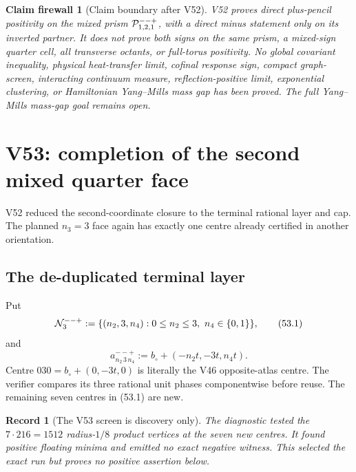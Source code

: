 \documentclass[11pt,oneside]{article}
\newtheorem{firewall}[theorem]{Claim firewall}
\newtheorem{record}[theorem]{Record}
\theoremstyle{definition}
\theoremstyle{remark}
\begin{document}
\begin{firewall}[Claim boundary after V52]
\label{fire:newv52-final}
V52 proves direct plus-pencil positivity on the mixed prism
\({\cal P}_{1,2,1}^{--+}\), with a direct minus statement only on
its inverted partner.  It does not prove both signs on the same
prism, a mixed-sign quarter cell, all transverse octants, or
full-torus positivity.  No global covariant inequality, physical
heat-transfer limit, cofinal response sign, compact graph-screen,
interacting continuum measure, reflection-positive limit,
exponential clustering, or Hamiltonian Yang--Mills mass gap has
been proved.  The full Yang--Mills mass-gap goal remains open.
\end{firewall}

\section{V53: completion of the second mixed quarter face}
\label{sec:newv53-mixed-second-quarter-face}

V52 reduced the second-coordinate closure to the terminal rational
layer and cap.  The planned \(n_3=3\) face again has exactly one
centre already certified in another orientation.

\subsection{The de-duplicated terminal layer}

Put
\[
 {\cal N}_{3}^{--+}:=
 \{(n_2,3,n_4):0\le n_2\le3,\ n_4\in\{0,1\}\},        \tag{53.1}
\]
and
\[
 a_{n_2\,3\,n_4}^{--+}
 :=b_\circ+(-n_2t,-3t,n_4t).                         \tag{53.2}
\]
Centre \(030=b_\circ+(0,-3t,0)\) is literally the V46
opposite-atlas centre.  The verifier compares its three rational
unit phases componentwise before reuse.  The remaining seven
centres in (53.1) are new.

\begin{record}[The V53 screen is discovery only]
\label{rec:newv53-screen}
The diagnostic tested the \(7\cdot216=1512\) radius-\(1/8\)
product vertices at the seven new centres.  It found positive
floating minima and emitted no exact negative witness.  This
selected the exact run but proves no positive assertion below.
\end{record}
\end{document}
